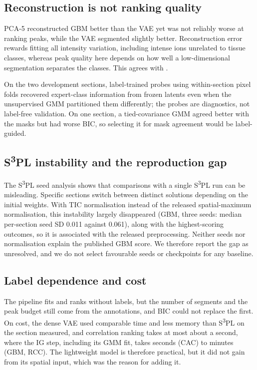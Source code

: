 \subsection{Reconstruction is not ranking quality}
PCA-5 reconstructed GBM better than the VAE yet was not reliably worse at
ranking peaks, while the VAE segmented slightly better. Reconstruction error rewards fitting all intensity variation,
including intense ions unrelated to tissue classes, whereas peak quality here
depends on how well a low-dimensional segmentation separates the classes. This
agrees with \citet{mazarura2025autoencoder}.

On the two development sections, label-trained probes using within-section pixel
folds recovered expert-class information from frozen latents even when the
unsupervised GMM partitioned them differently; the probes are diagnostics,
not label-free validation. On one section, a tied-covariance GMM agreed better
with the masks but had worse
BIC, so selecting it for mask agreement would be label-guided.

\subsection{S\textsuperscript{3}PL instability and the reproduction gap}
The S\textsuperscript{3}PL seed analysis shows that comparisons with a single S\textsuperscript{3}PL run can be
misleading. Specific sections switch between distinct solutions depending on
the initial weights. With TIC normalisation instead of the released
spatial-maximum normalisation, this instability largely disappeared (GBM, three
seeds: median per-section seed SD 0.011 against 0.061), along with the highest-scoring outcomes, so it is
associated with the released preprocessing. Neither seeds nor normalisation explain the
published GBM score. We therefore report the gap as unresolved, and we do not
select favourable seeds or checkpoints for any baseline.

\subsection{Label dependence and cost}
The pipeline fits and ranks without labels, but the number of segments and
the peak budget still come from the annotations, and BIC could not replace the
first. On cost, the dense VAE used comparable time and less memory than
S\textsuperscript{3}PL on the section measured, and correlation ranking takes
at most about a second, where the IG step, including its GMM fit, takes seconds
(CAC) to minutes (GBM, RCC). The
lightweight model is therefore practical, but it did not gain from its spatial
input, which was the reason for adding it.

